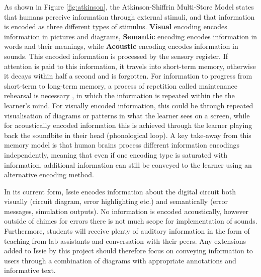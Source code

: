 As shown in Figure \ref{fig:atkinson}, the Atkinson-Shiffrin Multi-Store Model states that humans perceive information through external stimuli, and that information is encoded as three different types of stimulus. \textbf{Visual} encoding encodes information in pictures and diagrams, \textbf{Semantic} encoding encodes information in words and their meanings, while \textbf{Acoustic} encoding encodes information in sounds. This encoded information is processed by the sensory register. If attention is paid to this information, it travels into short-term memory, otherwise it decays within half a second and is forgotten. For information to progress from short-term to long-term memory, a process of repetition called maintenance rehearsal is necessary \cite{multi_store}, in which the information is repeated within the the learner's mind. For visually encoded information, this could be through repeated visualisation of diagrams or patterns in what the learner sees on a screen, while for acoustically encoded information this is achieved through the learner playing back the soundbite in their head (phonological loop). A key take-away from this memory model is that human brains process different information encodings independently, meaning that even if one encoding type is saturated with information, additional information can still be conveyed to the learner using an alternative encoding method. 

In its current form, Issie encodes information about the digital circuit both visually (circuit diagram, error highlighting etc.) and semantically (error messages, simulation outputs). No information is encoded acoustically, however outside of chimes for errors there is not much scope for implementation of sounds. Furthermore, students will receive plenty of auditory information in the form of teaching from lab assistants and conversation with their peers. Any extensions added to Issie by this project should therefore focus on conveying information to users through a combination of diagrams with appropriate annotations and informative text.

